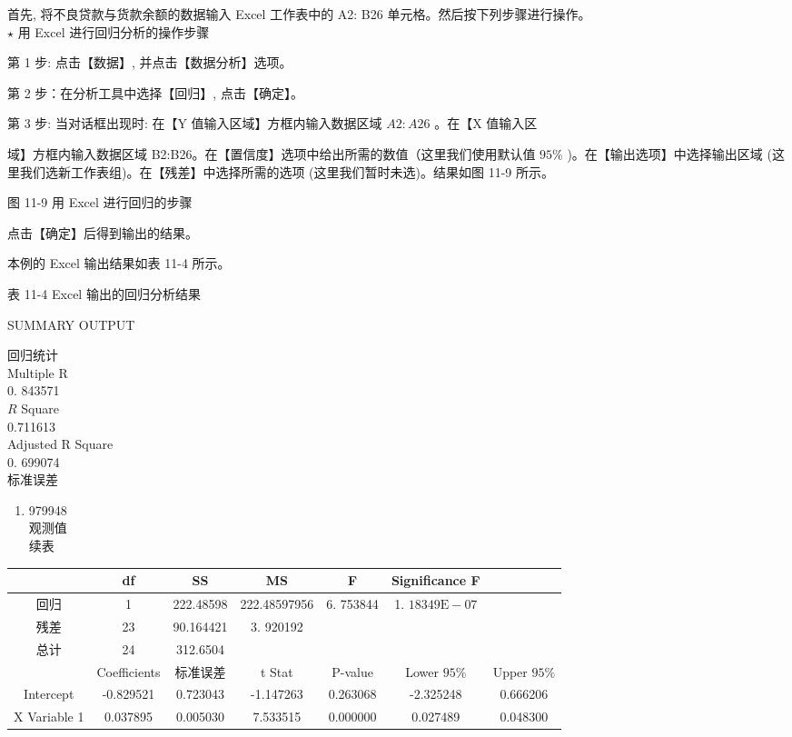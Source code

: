 \documentclass[10pt]{article}
\begin{document}
\begin{CJK*}{UTF8}{bsmi}
首先, 将不良贷款与货款余额的数据输入 Excel 工作表中的 A2: B26 单元格。然后按下列步骤进行操作。\\
$\star$ 用 Excel 进行回归分析的操作步骤

第 1 步: 点击【数据】, 并点击【数据分析】选项。

第 2 步：在分析工具中选择【回归】, 点击【确定】。

第 3 步: 当对话框出现时: 在【Y 值输入区域】方框内输入数据区域 $A 2: A 26$ 。在【X 值输入区

域】方框内输入数据区域 B2:B26。在【置信度】选项中给出所需的数值（这里我们使用默认值 $95 \%$ )。在【输出选项】中选择输出区域 (这里我们选新工作表组)。在【残差】中选择所需的选项 (这里我们暂时未选)。结果如图 11-9 所示。

\begin{center}
\end{center}

图 11-9 用 Excel 进行回归的步骤

点击【确定】后得到输出的结果。

本例的 Excel 输出结果如表 11-4 所示。

表 11-4 Excel 输出的回归分析结果

SUMMARY OUTPUT

回归统计\\
Multiple R\\
0. 843571\\
$R$ Square\\
0.711613\\
Adjusted R Square\\
0. 699074\\
标准误差

\begin{enumerate}
  \item 979948\\
观测值\\
续表
\end{enumerate}

\begin{center}
\begin{tabular}{|c|c|c|c|c|c|c|}
\hline
 & df & SS & MS & F & Significance F &  \\
\hline
回归 & 1 & 222.48598 & 222.48597956 & 6. 753844 & 1. $18349 \mathrm{E}-07$ &  \\
\hline
残差 & 23 & 90.164421 & 3. 920192 &  &  &  \\
\hline
\multirow[t]{2}{*}{总计} & 24 & 312.6504 &  &  &  &  \\
\hline
 & Coefficients & 标准误差 & t Stat & P-value & Lower $95 \%$ & Upper $95 \%$ \\
\hline
Intercept & -0.829521 & 0.723043 & -1.147263 & 0.263068 & -2.325248 & 0.666206 \\
\hline
X Variable 1 & 0.037895 & 0.005030 & 7.533515 & 0.000000 & 0.027489 & 0.048300 \\
\hline
\end{tabular}
\end{center}


\end{CJK*}
\end{document}
